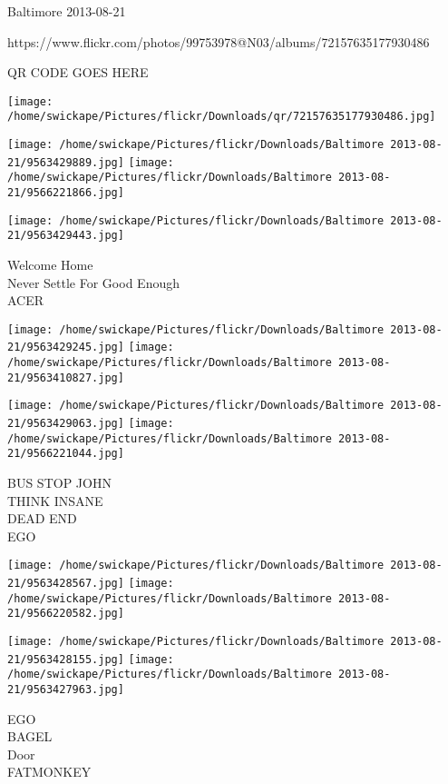 \documentclass[10pt,letterpaper]{article}
\begin{document}
Baltimore 2013-08-21

https://www.flickr.com/photos/99753978@N03/albums/72157635177930486

QR CODE GOES HERE

\texttt{[image: /home/swickape/Pictures/flickr/Downloads/qr/72157635177930486.jpg]}
\pagebreak

\texttt{[image: /home/swickape/Pictures/flickr/Downloads/Baltimore 2013-08-21/9563429889.jpg]}
\texttt{[image: /home/swickape/Pictures/flickr/Downloads/Baltimore 2013-08-21/9566221866.jpg]}

\vspace{0.25in}
\texttt{[image: /home/swickape/Pictures/flickr/Downloads/Baltimore 2013-08-21/9563429443.jpg]}

Welcome Home\\
Never Settle For Good Enough\\
ACER\\
\pagebreak

\texttt{[image: /home/swickape/Pictures/flickr/Downloads/Baltimore 2013-08-21/9563429245.jpg]}
\texttt{[image: /home/swickape/Pictures/flickr/Downloads/Baltimore 2013-08-21/9563410827.jpg]}

\texttt{[image: /home/swickape/Pictures/flickr/Downloads/Baltimore 2013-08-21/9563429063.jpg]}
\texttt{[image: /home/swickape/Pictures/flickr/Downloads/Baltimore 2013-08-21/9566221044.jpg]}

BUS STOP JOHN\\
THINK INSANE\\
DEAD END\\
EGO\\
\pagebreak

\texttt{[image: /home/swickape/Pictures/flickr/Downloads/Baltimore 2013-08-21/9563428567.jpg]}
\texttt{[image: /home/swickape/Pictures/flickr/Downloads/Baltimore 2013-08-21/9566220582.jpg]}

\texttt{[image: /home/swickape/Pictures/flickr/Downloads/Baltimore 2013-08-21/9563428155.jpg]}
\texttt{[image: /home/swickape/Pictures/flickr/Downloads/Baltimore 2013-08-21/9563427963.jpg]}

EGO\\
BAGEL\\
Door\\
FATMONKEY\\
\pagebreak
\end{document}
